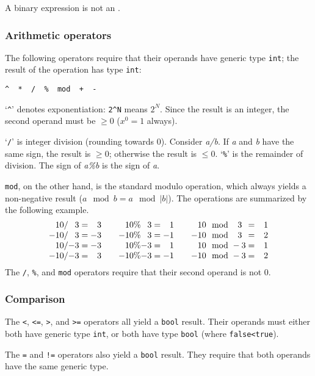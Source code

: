 A binary expression is not an \lvalue.


\subsubsection{Arithmetic operators}\label{sec:arithmetic}

The following operators require that their operands have generic type
{\tt{}int}; the result of the operation has type {\tt{}int}:
\begin{verbatim}
^  *  /  %  mod  +  -
\end{verbatim}
`\verb|^|' denotes exponentiation: \verb|2^N| means $2^N$. Since the result is an
integer, the second operand must be $\ge 0$ ($x^0=1$ always).

`{\tt{}/}' is integer division (rounding towards 0). Consider {\it{}a/b}.
If {\it{}a} and {\it{}b} have the same sign, the result is $\ge 0$; otherwise
the result is $\le 0$. `{\tt{}\%}' is the remainder of division. The
sign of {\it{}a\%b} is the sign of {\it{}a}.

{\tt{}mod}, on the other hand, is the standard modulo operation, which
always yields a non-negative result ($a \mod b = a \mod\vert b\vert$).
The operations are summarized by the following example.
$$
\vbox{\def\+{\phantom{-}}
\halign{$#$\hfil&${}#$\hfil\qquad&$#$\hfil&${}#$\hfil\qquad&$#$\hfil&
${}#$\hfil\cr
\+10/\+3 &= \+3&   \+10\%\+3 &= \+1&	\+10 \mod \+3 &= \+1\cr
-10/\+3 &= -3&	   -10\%\+3 &= -1&	-10 \mod \+3 &= \+2\cr
\+10/{-3} &= -3&   \+10\%{-3} &= \+1&	\+10 \mod {-3} &= \+1\cr
-10/{-3} &= \+3&   -10\%{-3} &= -1&	-10 \mod {-3} &= \+2\cr
}}
$$
The {\tt{}/}, {\tt{}\%}, and {\tt{}mod} operators require that their second
operand is not $0$.



\subsubsection{Comparison}\label{sec:comparison}

The {\tt{}<}, {\tt{}<=}, {\tt{}>}, and {\tt{}>=} operators all yield a {\tt{}bool} result. Their
operands must either both have generic type {\tt{}int}, or both have
type {\tt{}bool} (where {\tt{}false<true}).

The {\tt{}=} and {\tt{}!=} operators also yield a {\tt{}bool} result. They
require that both operands have the same generic type.

